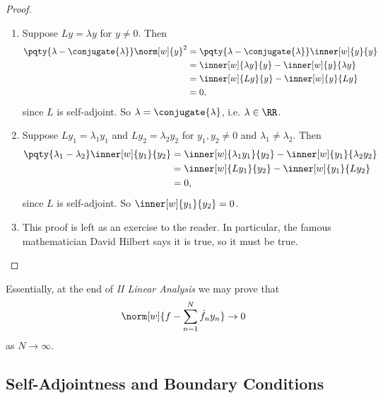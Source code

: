 \begin{proof}
    \begin{enumerate}[label=(\roman*)]
        \item Suppose \(L y = \lambda y\) for \(y \neq 0\). Then
        \begin{subequations}
            \begin{align}
                \pqty{\lambda - \conjugate{\lambda}} \norm[w]{y}^2 &= \pqty{\lambda - \conjugate{\lambda}} \inner[w]{y}{y} \\
                &= \inner[w]{\lambda y}{y} - \inner[w]{y}{\lambda y} \\
                &= \inner[w]{Ly}{y} - \inner[w]{y}{Ly} \\
                &= 0,
            \end{align}
        \end{subequations}
        since \(L\) is self-adjoint. So \(\lambda = \conjugate{\lambda}\), i.e. \(\lambda \in \RR\).

        \item Suppose \(L y_1 = \lambda_1 y_1\) and \(L y_2 = \lambda_2 y_2\) for \(y_1, y_2 \neq 0\) and \(\lambda_1 \neq \lambda_2\). Then
        \begin{subequations}
            \begin{align}
                \pqty{\lambda_1 - \lambda_2} \inner[w]{y_1}{y_2} &= \inner[w]{\lambda_1 y_1}{y_2} - \inner[w]{y_1}{\lambda_2 y_2} \\
                &= \inner[w]{Ly_1}{y_2} - \inner[w]{y_1}{Ly_2} \\
                &= 0,
            \end{align}
        \end{subequations}
        since \(L\) is self-adjoint. So \(\inner[w]{y_1}{y_2} = 0\).

        \item This proof is left as an exercise to the reader. In particular, the famous mathematician David Hilbert says it is true, so it must be true.
    \end{enumerate}
\end{proof}

\small
Essentially, at the end of \textit{II Linear Analysis} we may prove that
\begin{equation}
    \norm[w]{f - \sum_{n = 1}^{N} \hat{f}_n y_n} \to 0
\end{equation}
as \(N \to \infty\).
\normalsize

\subsection{Self-Adjointness and Boundary Conditions}

